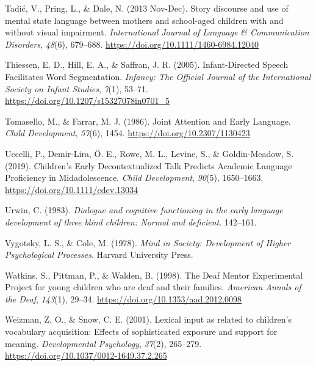 \documentclass[
  man,floatsintext]{apa6}
\newlength{\cslhangindent}
\newlength{\cslentryspacingunit} %
\newenvironment{CSLReferences}[2] %
 {%
  \setlength{\parindent}{0pt}
  \ifodd #1
  \let\oldpar\par
  \def\par{\hangindent=\cslhangindent\oldpar}
  \fi
  \setlength{\parskip}{#2\cslentryspacingunit}
 }%
 {}
\begin{document}
\begin{CSLReferences}{1}{0}
\leavevmode{}%
Tadić, V., Pring, L., \& Dale, N. (2013 Nov-Dec). Story discourse and use of mental state language between mothers and school-aged children with and without visual impairment. \emph{International Journal of Language \& Communication Disorders}, \emph{48}(6), 679--688. \url{https://doi.org/10.1111/1460-6984.12040}

\leavevmode{}%
Thiessen, E. D., Hill, E. A., \& Saffran, J. R. (2005). Infant-{Directed Speech Facilitates Word Segmentation}. \emph{Infancy: The Official Journal of the International Society on Infant Studies}, \emph{7}(1), 53--71. \url{https://doi.org/10.1207/s15327078in0701_5}

\leavevmode{}%
Tomasello, M., \& Farrar, M. J. (1986). Joint {Attention} and {Early Language}. \emph{Child Development}, \emph{57}(6), 1454. \url{https://doi.org/10.2307/1130423}

\leavevmode{}%
Uccelli, P., Demir-Lira, Ö. E., Rowe, M. L., Levine, S., \& Goldin-Meadow, S. (2019). Children's {Early Decontextualized Talk Predicts Academic Language Proficiency} in {Midadolescence}. \emph{Child Development}, \emph{90}(5), 1650--1663. \url{https://doi.org/10.1111/cdev.13034}

\leavevmode{}%
Urwin, C. (1983). \emph{Dialogue and cognitive functioning in the early language development of three blind children: {Normal} and deficient}. 142--161.

\leavevmode{}%
Vygotsky, L. S., \& Cole, M. (1978). \emph{Mind in {Society}: {Development} of {Higher Psychological Processes}}. {Harvard University Press}.

\leavevmode{}%
Watkins, S., Pittman, P., \& Walden, B. (1998). The {Deaf Mentor Experimental Project} for young children who are deaf and their families. \emph{American Annals of the Deaf}, \emph{143}(1), 29--34. \url{https://doi.org/10.1353/aad.2012.0098}

\leavevmode{}%
Weizman, Z. O., \& Snow, C. E. (2001). Lexical input as related to children's vocabulary acquisition: Effects of sophisticated exposure and support for meaning. \emph{Developmental Psychology}, \emph{37}(2), 265--279. \url{https://doi.org/10.1037/0012-1649.37.2.265}


\end{CSLReferences}
\end{document}
